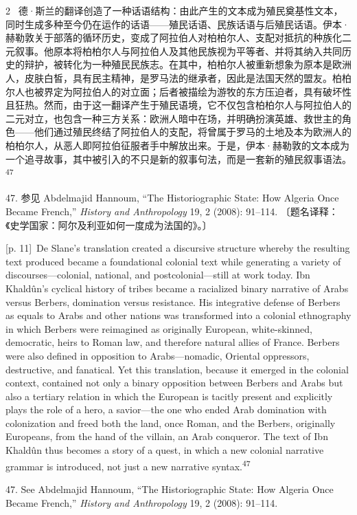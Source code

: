 \documentclass[10pt,a4paper]{article}
\begin{document}
\begin{paracol}{2}
\switchcolumn*
{\scriptsize\color{gray} [p. 11]}\ 德·斯兰的翻译创造了一种话语结构：由此产生的文本成为殖民奠基性文本，同时生成多种至今仍在运作的话语——殖民话语、民族话语与后殖民话语。伊本·赫勒敦关于部落的循环历史，变成了阿拉伯人对柏柏尔人、支配对抵抗的种族化二元叙事。他原本将柏柏尔人与阿拉伯人及其他民族视为平等者、并将其纳入共同历史的辩护，被转化为一种殖民民族志。在其中，柏柏尔人被重新想象为原本是欧洲人，皮肤白皙，具有民主精神，是罗马法的继承者，因此是法国天然的盟友。柏柏尔人也被界定为阿拉伯人的对立面；后者被描绘为游牧的东方压迫者，具有破坏性且狂热。然而，由于这一翻译产生于殖民语境，它不仅包含柏柏尔人与阿拉伯人的二元对立，也包含一种三方关系：欧洲人暗中在场，并明确扮演英雄、救世主的角色——他们通过殖民终结了阿拉伯人的支配，将曾属于罗马的土地及本为欧洲人的柏柏尔人，从恶人即阿拉伯征服者手中解放出来。于是，伊本·赫勒敦的文本成为一个追寻故事，其中被引入的不只是新的叙事句法，而是一套新的殖民叙事语\mbox{法。\textsuperscript{47}}\par{\small 47. 参见 Abdelmajid Hannoum, “The Historiographic State: How Algeria Once Became French,” \textit{History and Anthropology} 19, 2 (2008): 91–114. 〔题名译释：《史学国家：阿尔及利亚如何一度成为法国的》。〕\par}
\switchcolumn
{\scriptsize\color{gray} [p. 11]}\ De Slane’s translation created a discursive structure whereby the resulting text produced became a foundational colonial text while generating a variety of discourses—colonial, national, and postcolonial—still at work today. Ibn Khaldûn’s cyclical history of tribes became a racialized binary narrative of Arabs versus Berbers, domination versus resistance. His integrative defense of Berbers as equals to Arabs and other nations was transformed into a colonial ethnography in which Berbers were reimagined as originally European, white-skinned, democratic, heirs to Roman law, and therefore natural allies of France. Berbers were also defined in opposition to Arabs—nomadic, Oriental oppressors, destructive, and fanatical. Yet this translation, because it emerged in the colonial context, contained not only a binary opposition between Berbers and Arabs but also a tertiary relation in which the European is tacitly present and explicitly plays the role of a hero, a savior—the one who ended Arab domination with colonization and freed both the land, once Roman, and the Berbers, originally Europeans, from the hand of the villain, an Arab conqueror. The text of Ibn Khaldûn thus becomes a story of a quest, in which a new colonial narrative grammar is introduced, not just a new narrative syntax.\nobreak\textsuperscript{47}\par{\small 47. See Abdelmajid Hannoum, “The Historiographic State: How Algeria Once Became French,” \textit{History and Anthropology} 19, 2 (2008): 91–114.\par}

\end{paracol}
\end{document}

